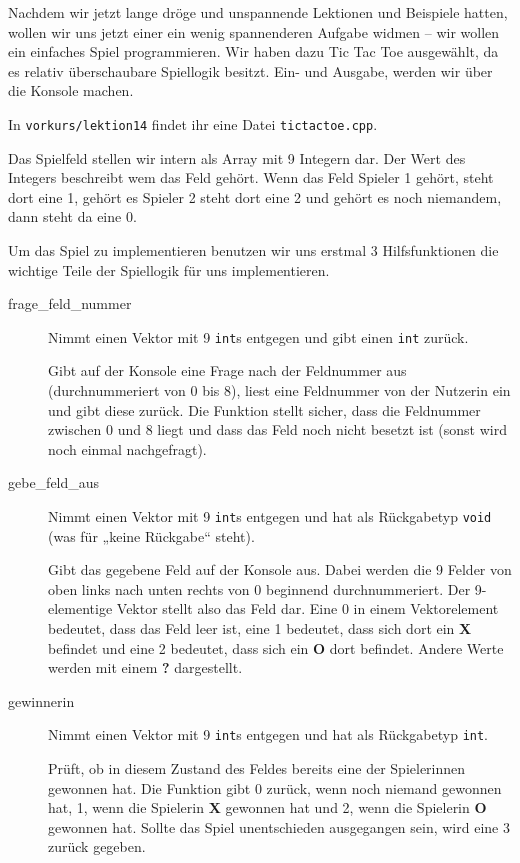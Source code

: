 
Nachdem wir jetzt lange dröge und unspannende Lektionen und Beispiele hatten, wollen wir uns jetzt einer
ein wenig spannenderen Aufgabe widmen -- wir wollen ein
einfaches Spiel programmieren. Wir haben dazu Tic Tac Toe ausgewählt, da es
relativ überschaubare Spiellogik besitzt. Ein- und Ausgabe, werden wir über die
Konsole machen.

In \texttt{vorkurs/lektion14} findet ihr eine Datei \texttt{tictactoe.cpp}. 

Das Spielfeld stellen wir intern als Array mit 9 Integern dar. Der Wert des Integers beschreibt wem das Feld gehört. 
Wenn das Feld Spieler 1 gehört, steht dort eine 1, gehört es Spieler 2 steht dort eine 2 und gehört es noch niemandem, 
dann steht da eine 0.

Um das Spiel zu implementieren benutzen wir uns erstmal 3 Hilfsfunktionen die wichtige Teile der Spiellogik für uns
implementieren.

\begin{description}
	\item[frage\_feld\_nummer]
	      Nimmt einen Vektor mit 9 \texttt{int}s entgegen und gibt einen \texttt{int} zurück.

	      Gibt auf der Konsole eine Frage nach der Feldnummer aus (durchnummeriert von 0 bis 8), liest eine Feldnummer von der Nutzerin ein und gibt diese zurück.
	      Die Funktion stellt sicher, dass die Feldnummer zwischen 0 und 8 liegt und dass das Feld noch nicht besetzt ist (sonst wird noch einmal nachgefragt).
	\item[gebe\_feld\_aus]
	      Nimmt einen Vektor mit 9 \texttt{int}s entgegen und hat als Rückgabetyp \texttt{void} (was für „keine Rückgabe“ steht).

	      Gibt das gegebene Feld auf der Konsole aus. Dabei werden die 9 Felder von oben links nach unten rechts von 0 beginnend durchnummeriert.
	      Der 9-elementige Vektor stellt also das Feld dar.
	      Eine 0 in einem Vektorelement bedeutet, dass das Feld leer ist, eine 1 bedeutet, dass sich dort ein \textbf{X} befindet und eine 2 bedeutet, dass sich ein \textbf{O} dort befindet.
	      Andere Werte werden mit einem \textbf{?} dargestellt.
	\item[gewinnerin]
	      Nimmt einen Vektor mit 9 \texttt{int}s entgegen und hat als Rückgabetyp \texttt{int}.

	      Prüft, ob in diesem Zustand des Feldes bereits eine der Spielerinnen gewonnen hat.
	      Die Funktion gibt 0 zurück, wenn noch niemand gewonnen hat, 1, wenn die Spielerin \textbf{X} gewonnen hat und 2, wenn die Spielerin \textbf{O} gewonnen hat.
	      Sollte das Spiel unentschieden ausgegangen sein, wird eine 3 zurück gegeben.
\end{description}



